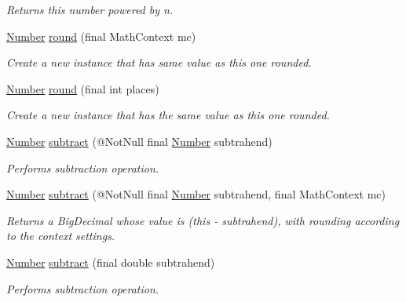 \begin{DoxyCompactItemize}
\begin{DoxyCompactList}\small\item\em Returns this number powered by n. \end{DoxyCompactList}\item 
\hyperlink{interfacecom_1_1aarrelaakso_1_1drawl_1_1_number}{Number} \hyperlink{interfacecom_1_1aarrelaakso_1_1drawl_1_1_number_aa49b7b3b06a362bdef37241652f35a44}{round} (final Math\+Context mc)
\begin{DoxyCompactList}\small\item\em Create a new instance that has same value as this one rounded. \end{DoxyCompactList}\item 
\hyperlink{interfacecom_1_1aarrelaakso_1_1drawl_1_1_number}{Number} \hyperlink{interfacecom_1_1aarrelaakso_1_1drawl_1_1_number_a0d76b3c8e56e9f18a3ce9baf42be705f}{round} (final int places)
\begin{DoxyCompactList}\small\item\em Create a new instance that has the same value as this one rounded. \end{DoxyCompactList}\item 
\hyperlink{interfacecom_1_1aarrelaakso_1_1drawl_1_1_number}{Number} \hyperlink{interfacecom_1_1aarrelaakso_1_1drawl_1_1_number_ac28e81198ea485a48568a9a543cb5293}{subtract} (@Not\+Null final \hyperlink{interfacecom_1_1aarrelaakso_1_1drawl_1_1_number}{Number} subtrahend)
\begin{DoxyCompactList}\small\item\em Performs subtraction operation. \end{DoxyCompactList}\item 
\hyperlink{interfacecom_1_1aarrelaakso_1_1drawl_1_1_number}{Number} \hyperlink{interfacecom_1_1aarrelaakso_1_1drawl_1_1_number_aae7cf801905b2510138d37ff932c4d30}{subtract} (@Not\+Null final \hyperlink{interfacecom_1_1aarrelaakso_1_1drawl_1_1_number}{Number} subtrahend, final Math\+Context mc)
\begin{DoxyCompactList}\small\item\em Returns a Big\+Decimal whose value is (this -\/ subtrahend), with rounding according to the context settings. \end{DoxyCompactList}\item 
\hyperlink{interfacecom_1_1aarrelaakso_1_1drawl_1_1_number}{Number} \hyperlink{interfacecom_1_1aarrelaakso_1_1drawl_1_1_number_ac04969f656d823c91e55a798df7d6913}{subtract} (final double subtrahend)
\begin{DoxyCompactList}\small\item\em Performs subtraction operation. \end{DoxyCompactList}\item 

\end{DoxyCompactItemize}
